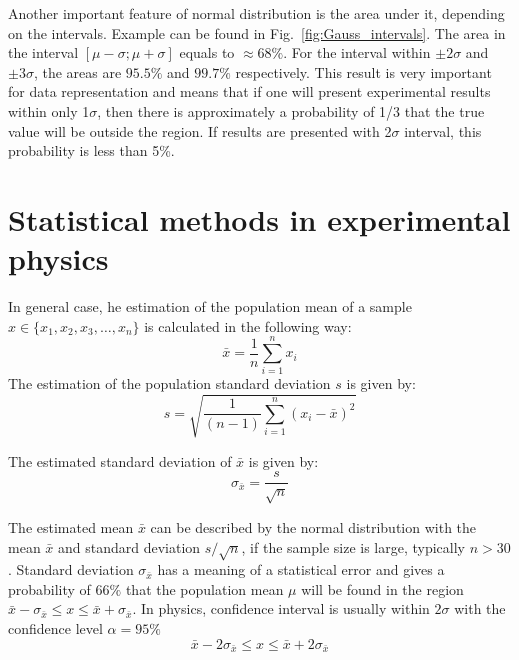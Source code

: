 \documentclass[12pt,a4paper]{report}
\begin{document}
Another important feature of normal distribution is the area under it, depending on the intervals. Example can be found in Fig.~\ref{fig:Gauss_intervals}. The area in the interval $[\mu-\sigma;\mu+\sigma]$ equals to $\approx 68\%$. For the interval within $\pm 2\sigma$ and $\pm 3\sigma$, the areas are $95.5\%$ and $99.7\%$ respectively. This result is very important for data representation and means that if one will present experimental results within only 1$\sigma$, then there is approximately a probability of 1/3 that the true value will be outside the region. If results are presented with 2$\sigma$ interval, this probability is less than 5\%.



\section{Statistical methods in experimental physics} \label{methods}

In general case, he estimation of the population mean of a sample $x \in \{ x_1, x_2, x_3, \dots , x_n \}$ is calculated in the following way:
\begin{equation} \label{av_value}
\bar{x} = \frac{1}{n} \sum_{i = 1}^{n} {x_i}
\end{equation}
The estimation of the population standard deviation $s$ is given by:
\begin{equation}
s = \sqrt{\frac{1}{(n-1)} \sum_{i = 1}^{n} {(x_i - \bar{x})^2}}
\end{equation}

The estimated standard deviation of $\bar{x}$ is given by:
\begin{equation} \label{standart_dev}
\sigma_{\bar{x}} = \frac{s}{ \sqrt{n} }
\end{equation}

The estimated mean $\bar{x}$ can be described by the normal distribution with the mean $\bar{x}$ and standard deviation $s / \sqrt{n}$, if the sample size is large, typically $n>30$.
Standard deviation $\sigma_{\bar{x}}$ has a meaning of a statistical error and gives a probability of 66$\%$ that the population mean $\mu$ will be found in the region $\bar{x} - \sigma_{\bar{x}} \le x \le \bar{x} + \sigma_{\bar{x}}$. In physics, confidence interval is usually within $2 \sigma$ with the confidence level $\alpha = 95 \%$
\begin{equation} \label{confidence_interval_large}
\bar{x} - 2 \sigma_{\bar{x}} \le x \le \bar{x} + 2 \sigma_{\bar{x}}
\end{equation}
\end{document}
